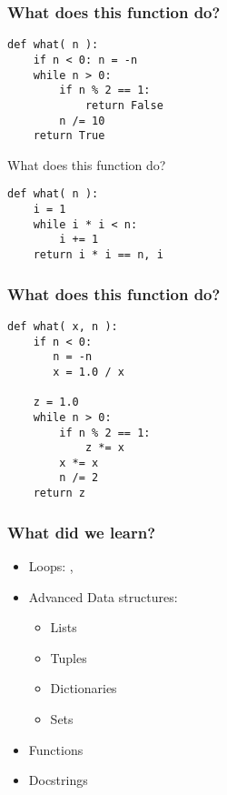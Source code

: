 \documentclass[14pt,compress]{beamer}
\newcommand{\kwrd}[1]{ \texttt{\textbf{\color{blue}{#1}}}  }
\begin{document}
\begin{frame}[fragile]
  \frametitle {What does this function do?}
  \begin{lstlisting}
def what( n ):
    if n < 0: n = -n
    while n > 0:
        if n % 2 == 1:
            return False
        n /= 10
    return True
  \end{lstlisting}
\end{frame} 

\begin{frame}[fragile]
  {What does this function do?}
\begin{lstlisting}
def what( n ):
    i = 1
    while i * i < n:
        i += 1
    return i * i == n, i
  \end{lstlisting}
\end{frame}

\begin{frame}[fragile]
  \frametitle {What does this function do?}
  \begin{lstlisting}
def what( x, n ):
    if n < 0: 
       n = -n
       x = 1.0 / x

    z = 1.0
    while n > 0:
        if n % 2 == 1:
            z *= x
        x *= x
        n /= 2
    return z
  \end{lstlisting}
\end{frame} 

\begin{frame}
  \frametitle{What did we learn?}
  \begin{itemize}
    \item Loops: \kwrd{while}, \kwrd{for}
    \item Advanced Data structures:
    \begin{itemize}
      \item Lists
      \item Tuples
      \item Dictionaries
      \item Sets
    \end{itemize}
    \item Functions
    \item Docstrings
  \end{itemize}
\end{frame}
\end{document}
